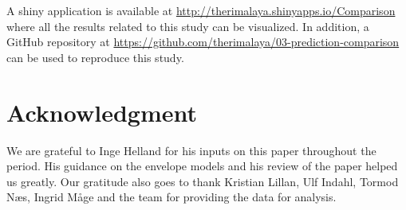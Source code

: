 \documentclass[review]{elsarticle}
\begin{document}
A shiny application \citep{shiny} is available at
\url{http://therimalaya.shinyapps.io/Comparison} where all the results
related to this study can be visualized. In addition, a GitHub
repository at
\url{https://github.com/therimalaya/03-prediction-comparison} can be
used to reproduce this study.

\section{Acknowledgment}\label{acknowledgment}

We are grateful to Inge Helland for his inputs on this paper throughout
the period. His guidance on the envelope models and his review of the
paper helped us greatly. Our gratitude also goes to thank Kristian
Lillan, Ulf Indahl, Tormod Næs, Ingrid Måge and the team for providing
the data for analysis.

\hypertarget{refs}{}

\appendix



\renewcommand\refname{References}

\end{document}
